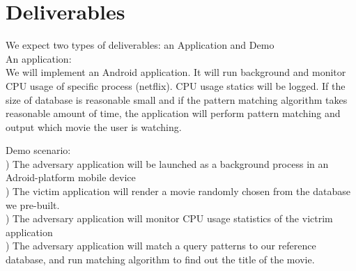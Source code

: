\section{Deliverables}
\label{sec:deliverables}
We expect two types of deliverables: an Application and Demo\\
An application: \\
We will implement an Android application.
It will run background and monitor CPU usage of specific process (netflix).
CPU usage statics will be logged.
If the size of database is reasonable small and if the pattern matching algorithm takes reasonable amount of time, 
the application will perform pattern matching and output which movie the user is watching. 

Demo scenario: \\
) The adversary application will be launched as a background process in an Adroid-platform mobile device\\
) The victim application will render a movie randomly chosen from the database we pre-built. \\
) The adversary application will monitor CPU usage statistics of the victrim application\\
) The adversary application will match a query patterns to our reference database, and run matching algorithm to find out the title of the movie.\\



